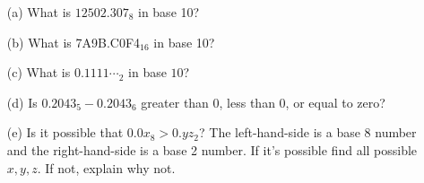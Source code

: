 \begin{enumerate}
\item[(a)] What is $12502.307_8$ in base 10?
\item[(b)] What is 7A9B.C0F4$_{16}$ in base 10?
\item[(c)] What is $0.1111\cdots_2$ in base $10$?
\item[(d)] Is $0.2043_5 - 0.2043_6$ greater than 0, less than 0, or equal to
zero?
\item[(e)] Is it possible that $0.0x_8 > 0.yz_2$?
  The left-hand-side is a base 8 number
  and the right-hand-side is a base 2 number.
  If it's possible find all possible $x, y, z$.
  If not, explain why not.
\end{enumerate}
